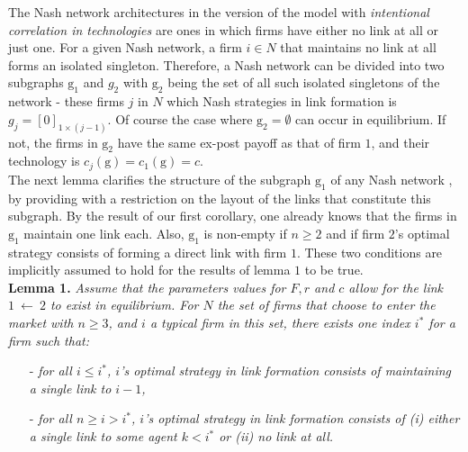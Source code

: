 \documentclass[11pt]{article}
\begin{document}
\indent The Nash network architectures in the version of the model with \textit{intentional correlation in technologies} are ones in which firms have either no link at all or just one. For  a given Nash network, a firm $i\in N$ that maintains no link at all forms an isolated singleton. Therefore, a Nash network can be divided into two subgraphs $\text{g}_1$ and $g_2$ with $\text{g}_2$ being the set of all such isolated singletons of the network  - these firms $j$ in $N$ which Nash strategies in link formation is $g_j=[0]_{1\times (j-1)}$. Of course the case where $\text{g}_2= \emptyset$ can occur in equilibrium. If not, the firms in $\text{g}_2$ have the same ex-post payoff as that of firm $1$, and their technology is $c_j(\text{g})=c_1(\text{g})=c$. \\
\indent  The next lemma clarifies the structure of the subgraph $\text{g}_1$ of any Nash network , by providing with a restriction on the layout of the links that constitute this subgraph. By the result of our first corollary, one already knows that the firms in $\text{g}_1$ maintain one link each. Also, $\text{g}_1$ is non-empty if $n\geq 2$ and if firm $2$'s optimal strategy consists of forming a direct link with firm $1$. These two conditions are implicitly assumed to hold for the results of lemma $1$ to be true. \\

\textbf{Lemma 1.} \textit{Assume that the parameters values for $F, r$ and $c$ allow for the link $1~ \leftarrow ~2$ to exist in equilibrium. For $N$ the set of firms that choose to enter the market with $n\geq 3$, and $i$ a typical firm in this set, there exists one index $i^*$ for a firm such that:}
\begin{itemize}
\item[-] \textit{for all $i\leq i^*$, $i$'s optimal strategy in link formation consists of maintaining a single link to $i-1$, }
\item[-] \textit{for all $n \geq i > i^*$, $i$'s optimal strategy in link formation consists of (i) either a single link to some agent $k<i^*$ or (ii) no link at all. }
\end{itemize}
 
\end{document}
